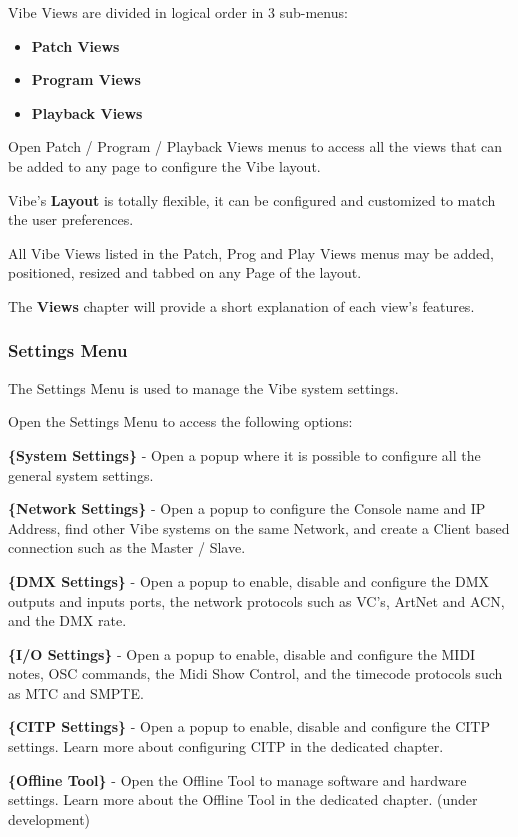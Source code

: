 \documentclass[
]{article}
\begin{document}
Vibe Views are divided in logical order in 3 sub-menus:

\begin{itemize}
\item
  \textbf{Patch Views}
\item
  \textbf{Program Views}
\item
  \textbf{Playback Views}
\end{itemize}

Open Patch / Program / Playback Views menus to access all the views that can be added to any page to configure the Vibe layout.

Vibe's \textbf{Layout} is totally flexible, it can be configured and customized to match the user preferences.

All Vibe Views listed in the Patch, Prog and Play Views menus may be added, positioned, resized and tabbed on any Page of the layout.

The \textbf{Views} chapter will provide a short explanation of each view's features.

\hypertarget{settings-menu}{%
\subsubsection{Settings Menu}\label{settings-menu}}

The Settings Menu is used to manage the Vibe system settings.

Open the Settings Menu to access the following options:

\textbf{\{System Settings\}} - Open a popup where it is possible to configure all the general system settings.

\textbf{\{Network Settings\}} - Open a popup to configure the Console name and IP Address, find other Vibe systems on the same Network, and create a Client based connection such as the Master / Slave.

\textbf{\{DMX Settings\}} - Open a popup to enable, disable and configure the DMX outputs and inputs ports, the network protocols such as VC's, ArtNet and ACN, and the DMX rate.

\textbf{\{I/O Settings\}} - Open a popup to enable, disable and configure the MIDI notes, OSC commands, the Midi Show Control, and the timecode protocols such as MTC and SMPTE.

\textbf{\{CITP Settings\}} - Open a popup to enable, disable and configure the CITP settings.
Learn more about configuring CITP in the dedicated chapter.

\textbf{\{Offline Tool\}} - Open the Offline Tool to manage software and hardware settings.
Learn more about the Offline Tool in the dedicated chapter. { (under development) }
\end{document}
